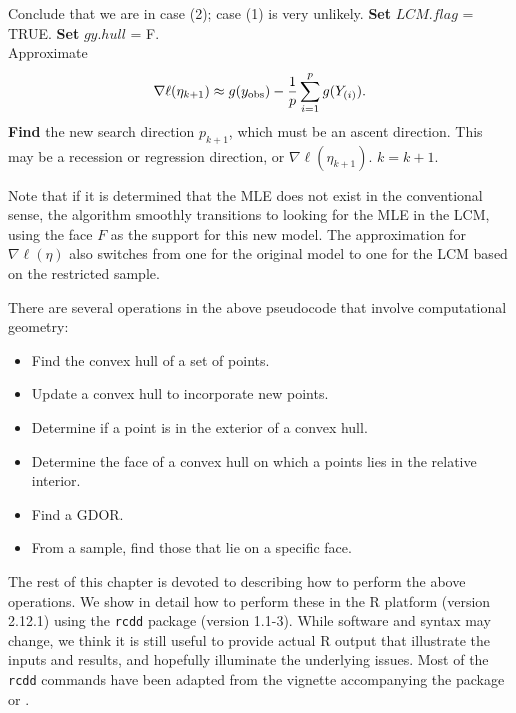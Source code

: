 {{\begin{algorithmic}
			\State Conclude that we are in case (2); case (1) is very unlikely.
			\State \textbf{Set} $LCM.flag$ = TRUE.
			\State \textbf{Set} $gy.hull$ = F.
		\EndIf
	\EndIf
\EndIf\\
	\State Approximate 
	\begin{align} \label{E:nabla ell approx LCM}
	\nabla \ell( \eta_{k+1}) \approx g(y_{\text{obs}}) - \frac{1}{p}\sum_{i=1}^p g(Y_{(i)}).
	\end{align}
\State \textbf{Find} the new search direction $p_{k+1}$, which must be an ascent 
direction.
\State This may be a recession or regression direction, or $\nabla \ell( \eta_{k+1})$.
\State $k = k + 1$.
\EndWhile
\end{algorithmic}
}
}

Note that if it is determined that the MLE does not exist in the conventional sense,
the algorithm smoothly transitions to looking for the MLE in the LCM, using the 
face $F$ as the support for this new model.  The approximation for $\nabla \ell (\eta)$
also switches from one for the original model to one for the LCM based on the restricted
sample.  

There are several operations in the above pseudocode that involve computational geometry:
\begin{itemize}
\item Find the convex hull of a set of points.
\item Update a convex hull to incorporate new points.
\item Determine if a point is in the exterior of a convex hull.
\item Determine the face of a convex hull on which a points lies in the relative interior.
\item Find a GDOR.
\item From a sample, find those that lie on a specific face.
\end{itemize}

The rest of this chapter is devoted to describing how to perform the above
operations.  We show in detail how to perform these in the R platform (version 2.12.1)
using the \texttt{rcdd} package (version 1.1-3).  While software and syntax may change,
we think it is still useful to provide actual R output that illustrate the
inputs and results, and hopefully illuminate the underlying issues.  Most of the  
\texttt{rcdd} commands have been adapted from the vignette accompanying the package
or \citet{Geyer:2009}.

